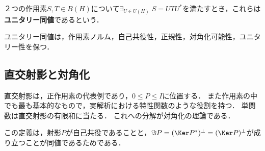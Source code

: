 \documentclass[uplatex,dvipdfmx]{jsreport}
\begin{document}
\begin{definition}\label{def-unitary-equivalent}
    ２つの作用素$S,T\in B(H)$について$\exists_{U\in U(H)}\;S=UTU^*$を満たすとき，これらは\textbf{ユニタリー同値}であるという．
\end{definition}

\begin{lemma}
    ユニタリー同値は，作用素ノルム，自己共役性，正規性，対角化可能性，ユニタリー性を保つ．
\end{lemma}

\subsection{直交射影と対角化}

\begin{tcolorbox}[colframe=ForestGreen, colback=ForestGreen!10!white,breakable,colbacktitle=ForestGreen!40!white,coltitle=black,fonttitle=\bfseries\sffamily,
title=対角化とは，直交射影への標準分解をいう．]
    直交射影は，正作用素の代表例であり，$0\le P\le I$に位置する．
    また作用素の中でも最も基本的なもので，実解析における特性関数のような役割を持つ．
    単関数は直交射影の有限和に当たる．
    これへの分解が対角化の理論である．
\end{tcolorbox}
\begin{remarks}
    この定義は，射影$P$が自己共役であることと，$\Im P=(\Ker P^*)^\perp=(\Ker P)^\perp$が成り立つことが同値であるためである．
\end{remarks}
\end{document}
